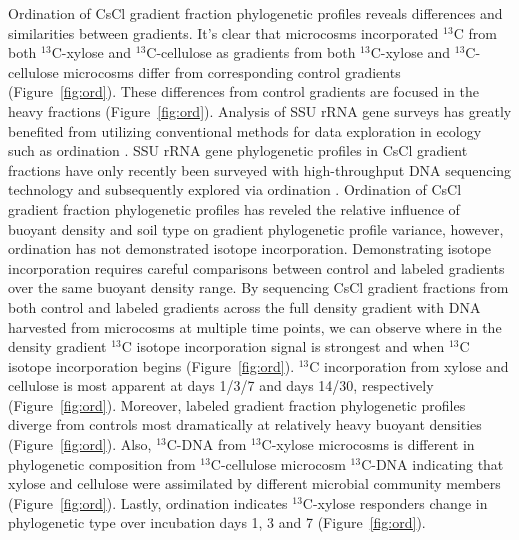 Ordination of CsCl gradient fraction phylogenetic profiles reveals differences
and similarities between gradients. It's clear that microcosms incorporated
$^{13}$C from both $^{13}$C-xylose and $^{13}$C-cellulose as gradients from
both $^{13}$C-xylose and $^{13}$C-cellulose microcosms differ from
corresponding control gradients (Figure~\ref{fig:ord}). These differences from
control gradients are focused in the heavy fractions (Figure~\ref{fig:ord}).
Analysis of SSU rRNA gene surveys has
greatly benefited from utilizing conventional methods for data exploration
in ecology such as ordination \citep{Lozupone_2008}.  SSU rRNA gene
phylogenetic profiles in CsCl gradient fractions have only recently been
surveyed with high-throughput DNA sequencing technology and subsequently
explored via ordination \citep{Angel_2013, Verastegui_2014}. Ordination of CsCl
gradient fraction phylogenetic profiles has reveled the relative influence of
buoyant density and soil type on gradient phylogenetic profile variance, 
however, ordination has not demonstrated isotope incorporation.  Demonstrating
isotope incorporation requires careful comparisons between control and labeled
gradients over the same buoyant density range. By sequencing CsCl gradient
fractions from both control and labeled gradients across the full density
gradient with DNA harvested from microcosms at multiple time points, we can
observe where in the density gradient $^{13}$C isotope incorporation signal is
strongest and when $^{13}$C isotope incorporation begins (Figure~\ref{fig:ord}).
$^{13}$C incorporation from xylose and cellulose is most apparent at days 1/3/7
and days 14/30, respectively (Figure~\ref{fig:ord}). Moreover, labeled gradient
fraction phylogenetic profiles diverge from controls most dramatically at
relatively heavy buoyant densities (Figure~\ref{fig:ord}). Also, $^{13}$C-DNA from $^{13}$C-xylose microcosms is different in phylogenetic composition from $^{13}$C-cellulose microcosm $^{13}$C-DNA indicating that xylose and cellulose were assimilated by different microbial community members (Figure~\ref{fig:ord}). Lastly, ordination indicates
$^{13}$C-xylose responders change in phylogenetic type over incubation days 1, 3 
and 7 (Figure~\ref{fig:ord}).

